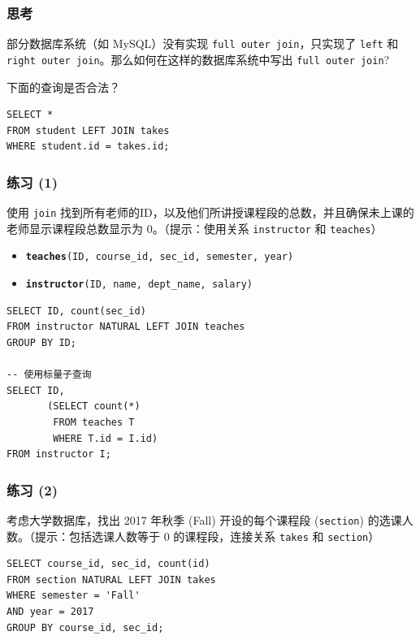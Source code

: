 \documentclass[aspectratio=169, 14pt]{beamer}
\begin{document}
\begin{frame}[fragile]
    \frametitle{思考}

    {\large {}}  部分数据库系统（如 MySQL）没有实现 \texttt{full outer join}，只实现了 \texttt{left} 和 \texttt{right outer join}。那么如何在这样的数据库系统中写出 \texttt{full outer join}?

    {\large {}} 下面的查询是否合法？

    \begin{verbatim}
SELECT * 
FROM student LEFT JOIN takes
WHERE student.id = takes.id;
    \end{verbatim}

\end{frame}

\begin{frame}
    \frametitle{练习 (1)}
    {\large {}}  使用 \texttt{join} 找到所有老师的ID，以及他们所讲授课程段的总数，并且确保未上课的老师显示课程段总数显示为 0。（提示：使用关系 \texttt{instructor} 和 \texttt{teaches}）

\begin{itemize}
    \item \texttt{\textbf{teaches}(ID, course\_id, sec\_id, semester, year)}
    \item \texttt{\textbf{instructor}(ID, name, dept\_name, salary)}
\end{itemize}
    
\end{frame}

\begin{frame}[fragile]

    \begin{verbatim}
SELECT ID, count(sec_id)
FROM instructor NATURAL LEFT JOIN teaches
GROUP BY ID;

-- 使用标量子查询
SELECT ID,
       (SELECT count(*)
        FROM teaches T
        WHERE T.id = I.id)
FROM instructor I;
    \end{verbatim}
\end{frame}

\begin{frame}[fragile]
    \frametitle{练习 (2)}
    {\large {}} 
    考虑大学数据库，找出 2017 年秋季 (Fall) 开设的每个课程段 (\texttt{section}) 的选课人数。（提示：包括选课人数等于 0 的课程段，连接关系 \texttt{takes} 和 \texttt{section}）

\pause
    \begin{verbatim}
SELECT course_id, sec_id, count(id)
FROM section NATURAL LEFT JOIN takes
WHERE semester = 'Fall'
AND year = 2017
GROUP BY course_id, sec_id;
    \end{verbatim}


\end{frame}
\end{document}
